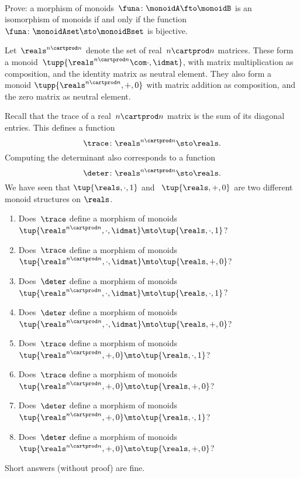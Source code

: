 \clearpage

~

\vfill%

\begin{gradedexercise}
    Prove: a morphism of monoids~$\funa\colon \monoidA \fto \monoidB$ is an isomorphism of monoids if and only if the function~$\funa\colon \monoidAset \sto \monoidBset$ is bijective.
\end{gradedexercise}

\begin{gradedexercise}
    \label{ex:TraceAndDeterminant}
    Let~$\reals^{n \cartprod n}$ denote the set of real~$n \cartprod n$ matrices.
    These form a monoid~$\tupp{\reals^{n \cartprod n}\com \cdot, \idmat}$, with matrix multiplication as composition, and the identity matrix as neutral element.
    They also form a monoid $\tupp{\reals^{n \cartprod n}, + , 0}$ with matrix addition as composition, and the zero matrix as neutral element.

    Recall that the trace of a real~$n \cartprod n$ matrix is the sum of its diagonal entries.
    This defines a function
    \begin{equation}
        \trace \colon \reals^{n \cartprod n} \sto \reals.
    \end{equation}
    Computing the determinant also corresponds to a function
    \begin{equation}
        \deter \colon \reals^{n \cartprod n} \sto \reals.
    \end{equation}
    We have seen that $\tup{ \reals, \cdot, 1}$ and ~$\tup{ \reals, +, 0}$ are two different monoid structures on $\reals$.
    \begin{enumerate}
        \item Does~$\trace$ define a morphism of monoids~$\tup{\reals^{n \cartprod n}, \cdot, \idmat} \mto \tup{ \reals, \cdot, 1}$?
        \item Does~$\trace$ define a morphism of monoids~$\tup{\reals^{n \cartprod n}, \cdot, \idmat} \mto \tup{ \reals, + , 0}$?
        \item Does~$\deter$ define a morphism of monoids~$\tup{\reals^{n \cartprod n}, \cdot, \idmat} \mto \tup{ \reals, \cdot, 1}$?
        \item Does~$\deter$ define a morphism of monoids~$\tup{\reals^{n \cartprod n}, \cdot, \idmat} \mto \tup{ \reals, + , 0}$?
        \item Does~$\trace$ define a morphism of monoids~$\tup{\reals^{n \cartprod n}, +, 0} \mto \tup{ \reals, \cdot, 1}$?
        \item Does~$\trace$ define a morphism of monoids~$\tup{\reals^{n \cartprod n}, +, 0} \mto \tup{ \reals, + , 0}$?
        \item Does~$\deter$ define a morphism of monoids~$\tup{\reals^{n \cartprod n}, +, 0} \mto \tup{ \reals, \cdot, 1}$?
        \item Does~$\deter$ define a morphism of monoids~$\tup{\reals^{n \cartprod n}, +, 0} \mto \tup{ \reals, + , 0}$?
    \end{enumerate}
    Short answers (without proof) are fine.
\end{gradedexercise}
